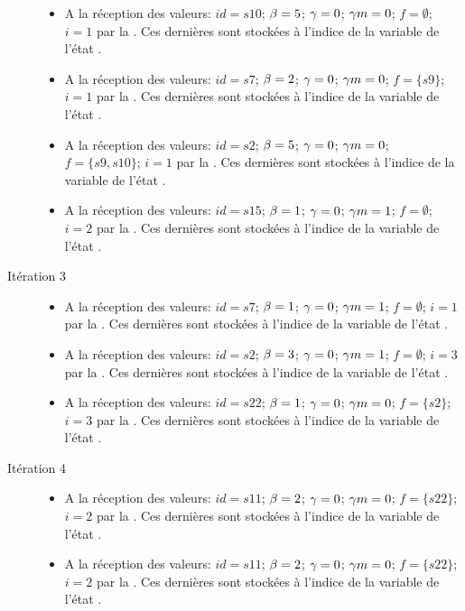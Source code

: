 \begin{Exemple}
\begin{description}
\begin{itemize}
			\item  A la réception des valeurs: $id =s10$; $\beta{}=5$; $\gamma{}=0$; $\gamma m{}=0$; $f =\emptyset$; $i=1$ par la \mtwo{}. Ces dernières sont stockées à l'indice  de la variable   de l'état .
			\item  A la réception des valeurs: $id =s7$; $\beta{}=2$; $\gamma{}=0$; $\gamma m{}=0$; $f =\{s9\}$; $i=1$ par la \mtwo{}. Ces dernières sont stockées à l'indice  de la variable   de l'état .
			\item  A la réception des valeurs: $id =s2$; $\beta{}=5$; $\gamma{}=0$; $\gamma m{}=0$; $f =\{s9,s10\}$; $i=1$ par la \mtree{}. Ces dernières sont stockées à l'indice  de la variable   de l'état .
			\item  A la réception des valeurs: $id =s15$; $\beta{}=1$; $\gamma{}=0$; $\gamma m{}=1$; $f =\emptyset$; $i=2$ par la \mtree{}. Ces dernières sont stockées à l'indice  de la variable   de l'état .
			\end{itemize}	
\item[Itération 3]
		\begin{itemize}
			\item  A la réception des valeurs: $id =s7$; $\beta{}=1$; $\gamma{}=0$; $\gamma m{}=1$; $f =\emptyset$; $i=1$ par la \mone{}. Ces dernières sont stockées à l'indice  de la variable   de l'état .
			\item  A la réception des valeurs: $id =s2$; $\beta{}=3$; $\gamma{}=0$; $\gamma m{}=1$; $f =\emptyset$; $i=3$ par la \mone{}. Ces dernières sont stockées à l'indice  de la variable   de l'état .
			\item  A la réception des valeurs: $id =s22$; $\beta{}=1$; $\gamma{}=0$; $\gamma m{}=0$; $f =\{s2\}$; $i=3$ par la \mtwo{}. Ces dernières sont stockées à l'indice  de la variable   de l'état .
			\end{itemize}
		\item[Itération 4]
		\begin{itemize}
			\item  A la réception des valeurs: $id =s11$; $\beta{}=2$; $\gamma{}=0$; $\gamma m{}=0$; $f =\{s22\}$; $i=2$ par la \mone{}. Ces dernières sont stockées à l'indice  de la variable   de l'état .
			\item  A la réception des valeurs: $id =s11$; $\beta{}=2$; $\gamma{}=0$; $\gamma m{}=0$; $f =\{s22\}$; $i=2$ par la \mtree{}. Ces dernières sont stockées à l'indice  de la variable   de l'état .

\end{itemize}
\end{description}
\end{Exemple}
